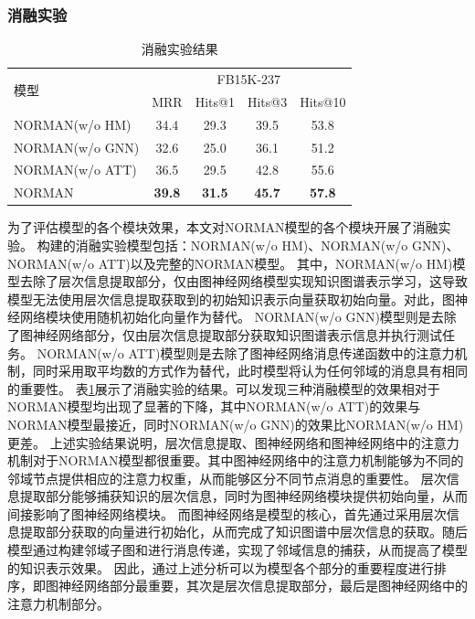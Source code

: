 \documentclass[algorithmlist, AutoFakeBold, AutoFakeSlant, figurelist, tablelist, nomlist, engineering]{seuthesix}
\begin{document}
\subsubsection{消融实验}
\begin{table}[t]
  \centering
  \caption{消融实验结果}
  \begin{tabular*}{0.95\textwidth}{@{\extracolsep{\fill}}lcccc}
    \toprule[1pt]
    \multirow{2}{*}{模型} & \multicolumn{4}{c}{FB15K-237} \\
      & MRR & Hits@1 & Hits@3 & Hits@10 \\ \hline
    NORMAN(w/o HM) & 34.4 & 29.3 & 39.5 & 53.8 \\
    NORMAN(w/o GNN) & 32.6 & 25.0 & 36.1 & 51.2 \\
    NORMAN(w/o ATT) & 36.5 & 29.5 & 42.8 & 55.6 \\
    NORMAN & \textbf{39.8} & \textbf{31.5} & \textbf{45.7} & \textbf{57.8} \\
    \bottomrule[1pt]
  \end{tabular*}
  \label{Experiment1_ablation}
\end{table}
为了评估模型的各个模块效果，本文对NORMAN模型的各个模块开展了消融实验。
构建的消融实验模型包括：NORMAN(w/o HM)、NORMAN(w/o GNN)、NORMAN(w/o ATT)以及完整的NORMAN模型。
其中，NORMAN(w/o HM)模型去除了层次信息提取部分，仅由图神经网络模型实现知识图谱表示学习，这导致模型无法使用层次信息提取获取到的初始知识表示向量获取初始向量。对此，图神经网络模块使用随机初始化向量作为替代。
NORMAN(w/o GNN)模型则是去除了图神经网络部分，仅由层次信息提取部分获取知识图谱表示信息并执行测试任务。
NORMAN(w/o ATT)模型则是去除了图神经网络消息传递函数中的注意力机制，同时采用取平均数的方式作为替代，此时模型将认为任何邻域的消息具有相同的重要性。
表\ref{Experiment1_ablation}展示了消融实验的结果。可以发现三种消融模型的效果相对于NORMAN模型均出现了显著的下降，其中NORMAN(w/o ATT)的效果与NORMAN模型最接近，同时NORMAN(w/o GNN)的效果比NORMAN(w/o HM)更差。
上述实验结果说明，层次信息提取、图神经网络和图神经网络中的注意力机制对于NORMAN模型都很重要。其中图神经网络中的注意力机制能够为不同的邻域节点提供相应的注意力权重，从而能够区分不同节点消息的重要性。
层次信息提取部分能够捕获知识的层次信息，同时为图神经网络模块提供初始向量，从而间接影响了图神经网络模块。
而图神经网络是模型的核心，首先通过采用层次信息提取部分获取的向量进行初始化，从而完成了知识图谱中层次信息的获取。随后模型通过构建邻域子图和进行消息传递，实现了邻域信息的捕获，从而提高了模型的知识表示效果。
因此，通过上述分析可以为模型各个部分的重要程度进行排序，即图神经网络部分最重要，其次是层次信息提取部分，最后是图神经网络中的注意力机制部分。
\end{document}
